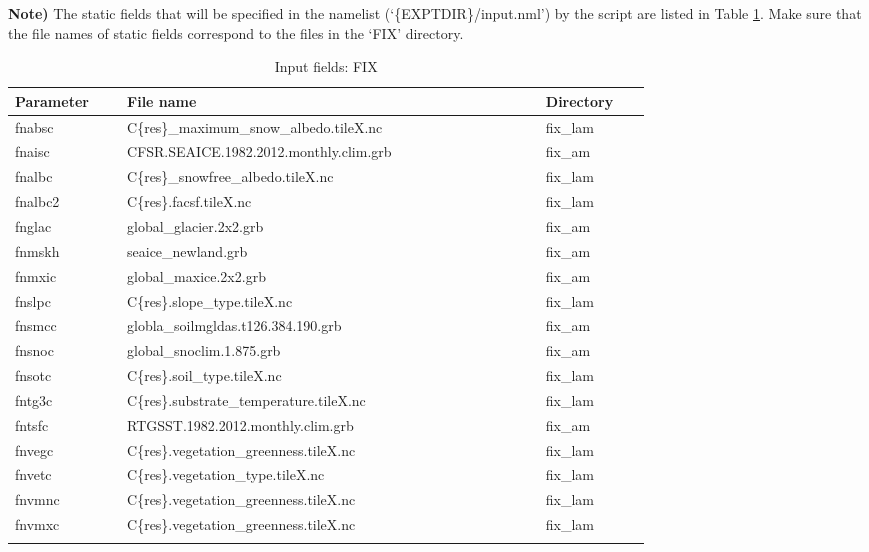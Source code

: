 \documentclass[11pt,fleqn]{report}              %
\begin{document}
\begin{enumerate}
{\bf Note)} The static fields that will be specified in the namelist (`\{EXPTDIR\}/input.nml') by the script are listed in Table \ref{table:fv3_input_nml_namsfc}. Make sure that the file names of static fields correspond to the files in the `FIX' directory. 
{
\scriptsize
\begin{longtable}{p{0.12\linewidth} | p{0.5\linewidth} | p{0.12\linewidth} }
\hline
\hline
Parameter & File name & Directory \\
\hline
 fnabsc & C\{res\}\_maximum\_snow\_albedo.tileX.nc & fix\_lam \\
 fnaisc  & CFSR.SEAICE.1982.2012.monthly.clim.grb & fix\_am \\
 fnalbc & C\{res\}\_snowfree\_albedo.tileX.nc & fix\_lam \\
 fnalbc2 & C\{res\}.facsf.tileX.nc & fix\_lam \\
 fnglac & global\_glacier.2x2.grb & fix\_am \\
 fnmskh & seaice\_newland.grb & fix\_am \\
 fnmxic  & global\_maxice.2x2.grb & fix\_am \\
 fnslpc & C\{res\}.slope\_type.tileX.nc & fix\_lam \\
 fnsmcc & globla\_soilmgldas.t126.384.190.grb & fix\_am \\
 fnsnoc & global\_snoclim.1.875.grb & fix\_am \\
 fnsotc & C\{res\}.soil\_type.tileX.nc & fix\_lam \\
 fntg3c & C\{res\}.substrate\_temperature.tileX.nc & fix\_lam \\
 fntsfc & RTGSST.1982.2012.monthly.clim.grb & fix\_am \\
 fnvegc & C\{res\}.vegetation\_greenness.tileX.nc & fix\_lam \\
 fnvetc & C\{res\}.vegetation\_type.tileX.nc & fix\_lam\\
 fnvmnc & C\{res\}.vegetation\_greenness.tileX.nc & fix\_lam\\
 fnvmxc & C\{res\}.vegetation\_greenness.tileX.nc & fix\_lam\\
\hline
\caption{Input fields: FIX}
\label{table:fv3_input_nml_namsfc}
\end{longtable}
}


\end{enumerate}
\end{document}
